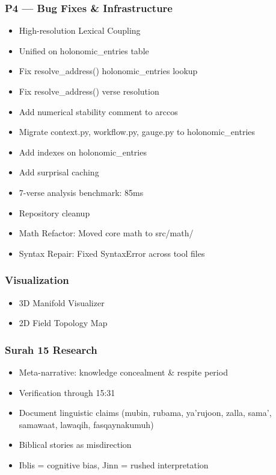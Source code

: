 \documentclass[12pt,a4paper]{article}
\providecommand{\tightlist}{\setlength{\itemsep}{0pt}\setlength{\parskip}{0pt}}
\begin{document}
\subsubsection{P4 --- Bug Fixes \&
Infrastructure}\label{p4-bug-fixes-infrastructure}

\begin{itemize}
\tightlist
\item
  High-resolution Lexical Coupling
\item
  Unified on holonomic\_entries table
\item
  Fix resolve\_address() holonomic\_entries lookup
\item
  Fix resolve\_address() verse resolution
\item
  Add numerical stability comment to arccos
\item
  Migrate context.py, workflow.py, gauge.py to holonomic\_entries
\item
  Add indexes on holonomic\_entries
\item
  Add surprisal caching
\item
  7-verse analysis benchmark: 85ms
\item
  Repository cleanup
\item
  Math Refactor: Moved core math to src/math/
\item
  Syntax Repair: Fixed SyntaxError across tool files
\end{itemize}

\subsubsection{Visualization}\label{visualization}

\begin{itemize}
\tightlist
\item
  3D Manifold Visualizer
\item
  2D Field Topology Map
\end{itemize}

\subsubsection{Surah 15 Research}\label{surah-15-research}

\begin{itemize}
\tightlist
\item
  Meta-narrative: knowledge concealment \& respite period
\item
  Verification through 15:31
\item
  Document linguistic claims (mubin, rubama, ya'rujoon, zalla, sama',
  samawaat, lawaqih, fasqaynakumuh)
\item
  Biblical stories as misdirection
\item
  Iblis = cognitive bias, Jinn = rushed interpretation
\end{itemize}
\end{document}
